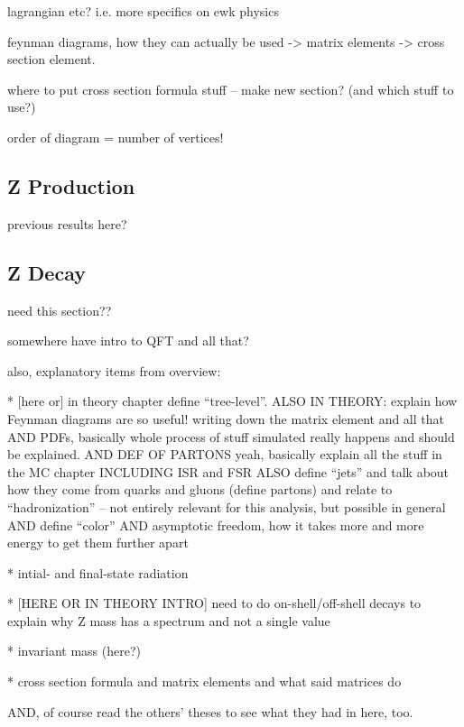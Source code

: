 lagrangian etc? i.e. more specifics on ewk physics

feynman diagrams, how they can actually be used -> 
matrix elements -> cross section element.  

where to put cross section formula stuff 
-- make new section?
(and which stuff to use?)

order of diagram = number of vertices!  

\subsection{Z Production}
\label{theory:Zprod}

previous results here?

\subsection{Z Decay}
\label{theory:Zdec}
need this section??


somewhere have intro to QFT and all that?  

also, explanatory items from overview:

   * [here or] in theory chapter define ``tree-level''.  
ALSO IN THEORY: explain how Feynman diagrams are so useful! 
writing down the matrix element and all that
AND PDFs, basically whole process of stuff simulated 
really happens and should be explained.  
AND DEF OF PARTONS
yeah, basically explain all the stuff in the MC chapter
INCLUDING ISR and FSR
ALSO define ``jets'' and talk about how they come from 
quarks and gluons (define partons) and relate to ``hadronization'' -- 
not entirely relevant for this analysis, 
but possible in general
AND define ``color''
AND asymptotic freedom, how it takes more and more energy to get them further apart

   * intial- and final-state radiation

   * [HERE OR IN THEORY INTRO] need to do on-shell/off-shell decays 
to explain why Z mass has a spectrum and not a single value

   * invariant mass (here?)

   * cross section formula and matrix elements and what said matrices do

AND, of course read the others' theses to see what they had in here, too.  



